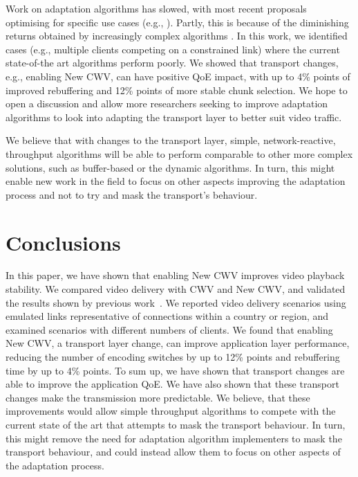 \documentclass[10pt,sigconf]{acmart}
\begin{document}
Work on adaptation algorithms has slowed, with most recent proposals optimising for specific use cases (e.g., \cite{Karagkioules-2020-achieving-low-latency}). Partly, this is because of the diminishing returns obtained by increasingly complex algorithms \cite{Yin-2015-a-control-theoritic-approach}. In this work, we identified cases (e.g., multiple clients competing on a constrained link) where the current state-of-the art algorithms perform poorly. We showed that transport changes, e.g., enabling New CWV, can have positive QoE impact, with up to 4\% points of improved rebuffering and 12\% points of more stable chunk selection. We hope to open a discussion and allow more researchers seeking to improve adaptation algorithms to look into adapting the transport layer to better suit video traffic.

We believe that with changes to the transport layer, simple, network-reactive, throughput algorithms will be able to perform comparable to other more complex solutions, such as buffer-based or the dynamic algorithms. In turn, this might enable new work in the field to focus on other aspects improving the adaptation process and not to try and mask the transport's behaviour.

\section{Conclusions}
\label{sec:conclusion}

In this paper, we have shown that enabling New CWV improves video playback stability. We compared video delivery with CWV and New CWV, and validated the results shown by previous work~\cite{Nazir-2014-performance-evaluation-congestion-window-validation-dash-newcwv}. We reported video delivery scenarios using emulated links representative of connections within a country or region, and examined scenarios with different numbers of clients. We found that enabling New CWV, a transport layer change, can improve application layer performance, reducing the number of encoding switches by up to 12\% points and rebuffering time by up to 4\% points. To sum up, we have shown that transport changes are able to improve the application QoE. We have also shown that these transport changes make the transmission more predictable. We believe, that these improvements would allow simple throughput algorithms to compete with the current state of the art that attempts to mask the transport behaviour. In turn, this might remove the need for adaptation algorithm implementers to mask the transport behaviour, and could instead allow them to focus on other aspects of the adaptation process. 
\end{document}
